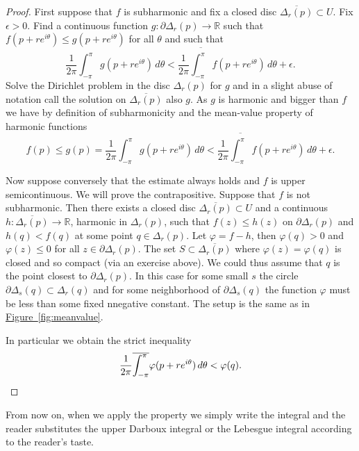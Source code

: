 \documentclass[12pt,openany]{book}
\newcommand{\R}{{\mathbb{R}}}
\theoremstyle{plain}
\theoremstyle{remark}
\theoremstyle{definition}
\theoremstyle{exercise}
\theoremstyle{example}
\newcommand{\figureref}[1]{\hyperref[#1]{Figure~\ref*{#1}}}
\begin{document}
\begin{proof}
First suppose that $f$ is subharmonic and fix a closed disc
$\overline{\Delta_r(p)} \subset U$.
Fix $\epsilon > 0$.
Find a continuous function $g \colon \partial \Delta_r(p) \to \R$
such that $f(p+ re^{i\theta}) \leq g(p+re^{i\theta})$ for all $\theta$
and such that
\begin{equation*}
\frac{1}{2\pi} \int_{-\pi}^{\pi} g(p+re^{i\theta})\, d\theta <
\frac{1}{2\pi} \overline{\int_{-\pi}^{\pi}} f(p+re^{i\theta})\, d\theta + \epsilon .
\end{equation*}
Solve the Dirichlet problem in the disc $\Delta_r(p)$ for $g$ and
in a slight abuse of notation call the solution on $\overline{\Delta_r(p)}$
also $g$.  As $g$ is harmonic and bigger than $f$ we have by
definition of subharmonicity and the mean-value property of harmonic
functions
\begin{equation*}
f(p) \leq g(p) =
\frac{1}{2\pi} \int_{-\pi}^{\pi} g(p+re^{i\theta})\, d\theta <
\frac{1}{2\pi} \overline{\int_{-\pi}^{\pi}} f(p+re^{i\theta})\, d\theta + \epsilon .
\end{equation*}

Now suppose conversely that the estimate always holds and $f$ is upper
semicontinuous.  We will prove the contrapositive.  Suppose that $f$ is not
subharmonic.  Then there exists a closed disc 
$\overline{\Delta_r(p)} \subset U$ and a continuous
$h \colon \overline{\Delta_r(p)} \to \R$, harmonic in $\Delta_r(p)$,
such that $f(z) \leq h(z)$ on $\partial \Delta_r(p)$ and
$h(q) < f(q)$ at some point $q \in \Delta_r(p)$.
Let $\varphi = f-h$, then $\varphi(q) > 0$ and $\varphi(z) \leq 0$
for all $z \in \partial \Delta_r(p)$.  The set
$S \subset \overline{\Delta_r(p)}$ where $\varphi(z) = \varphi(q)$ is closed and so
compact (via an exercise above).
We could thus assume that $q$ is the point closest to
$\partial \Delta_r(p)$.  In this case for some small $s$ the circle
$\partial \Delta_s(q) \subset \Delta_r(q)$ and for some neighborhood
of $\partial \Delta_s(q)$ the function $\varphi$ must be less than some fixed
nnegative constant.  The setup is the same as in \figureref{fig:meanvalue}.

In particular we obtain the strict inequality
\begin{equation*}
\frac{1}{2\pi} \overline{\int_{-\pi}^{\pi}} \varphi(p+re^{i\theta})\, d\theta <
\varphi(q) . \qedhere
\end{equation*}
\end{proof}

From now on, when we apply the property we simply write the integral and
the reader substitutes the upper Darboux integral or the Lebesgue integral
according to the reader's taste.
\end{document}
